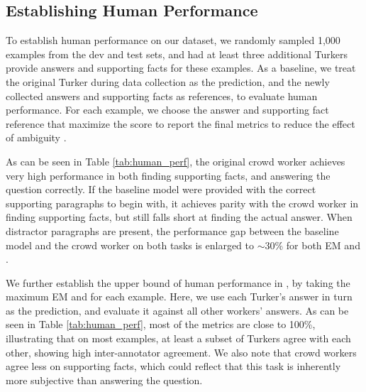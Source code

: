 
\subsection{Establishing Human Performance} \label{sec:human}

To establish human performance on our dataset, we randomly sampled 1,000 examples from the dev and test sets, and had at least three additional Turkers provide answers and supporting facts for these examples.
As a baseline, we treat the original Turker during data collection as the prediction, and the newly collected answers and supporting facts as references, to evaluate human performance.
For each example, we choose the answer and supporting fact reference that maximize the \fone{} score to report the final metrics to reduce the effect of ambiguity \cite{rajpurkar2016squad}.

As can be seen in Table \ref{tab:human_perf}, the original crowd worker achieves very high performance in both finding supporting facts, and answering the question correctly.
If the baseline model were provided with the correct supporting paragraphs to begin with, it achieves parity with the crowd worker in finding supporting facts, but still falls short at finding the actual answer.
When distractor paragraphs are present,  the performance gap between the baseline model and the crowd worker on both tasks is enlarged to $\sim$30\% for both EM and \fone{}.

We further establish the upper bound of human performance in \datasetname, by taking the maximum EM and \fone{} for each example.
Here, we use each Turker's answer in turn as the prediction, and evaluate it against all other workers' answers.
As can be seen in Table \ref{tab:human_perf}, most of the metrics are close to 100\%, illustrating that on most examples, at least a subset of Turkers agree with each other, showing high inter-annotator agreement.
We also note that crowd workers agree less on supporting facts, which could reflect that this task is inherently more subjective than answering the question.

